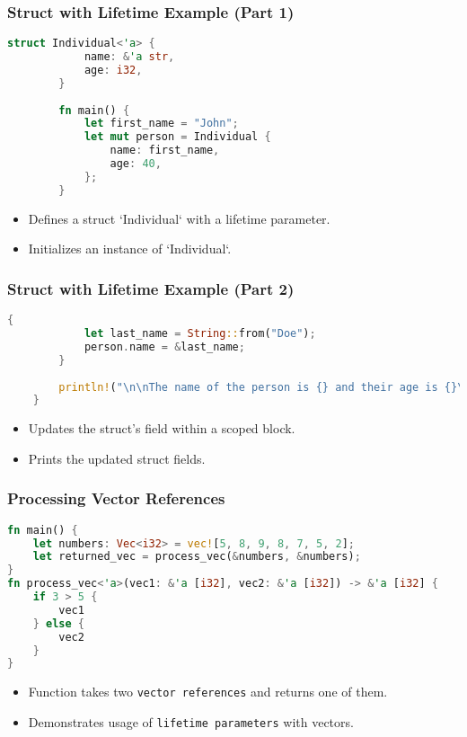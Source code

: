 \documentclass[aspectratio=169, table]{beamer}
\begin{document}
\begin{frame}[fragile]
	\frametitle{Struct with Lifetime Example (Part 1)}
	\vspace{15pt}
	\begin{lstlisting}[language=Rust]
		struct Individual<'a> {
			name: &'a str,
			age: i32,
		}
		
		fn main() {
			let first_name = "John";
			let mut person = Individual {
				name: first_name,
				age: 40,
			};
		}
	\end{lstlisting}
	\begin{itemize}
		\item Defines a struct `Individual` with a lifetime parameter.
		\item Initializes an instance of `Individual`.
	\end{itemize}
\end{frame}

\begin{frame}[fragile]
	\frametitle{Struct with Lifetime Example (Part 2)}
	\begin{lstlisting}[language=Rust]
		{
			let last_name = String::from("Doe");
			person.name = &last_name;
		}
		
		println!("\n\nThe name of the person is {} and their age is {}\n\n", person.name, person.age);
	}
\end{lstlisting}
\begin{itemize}
	\item Updates the struct's field within a scoped block.
	\item Prints the updated struct fields.
\end{itemize}
\end{frame}


\begin{frame}[fragile]
\frametitle{Processing Vector References}
\vspace{15pt}
\begin{lstlisting}[language=Rust]
fn main() {
	let numbers: Vec<i32> = vec![5, 8, 9, 8, 7, 5, 2];
	let returned_vec = process_vec(&numbers, &numbers);
}
fn process_vec<'a>(vec1: &'a [i32], vec2: &'a [i32]) -> &'a [i32] {
	if 3 > 5 {
		vec1
	} else {
		vec2
	}
}
\end{lstlisting}
\begin{itemize}
\item Function takes two \texttt{vector\ references} and returns one of them.
\item Demonstrates usage of \texttt{lifetime\ parameters} with vectors.
\end{itemize}
\end{frame}
\end{document}
